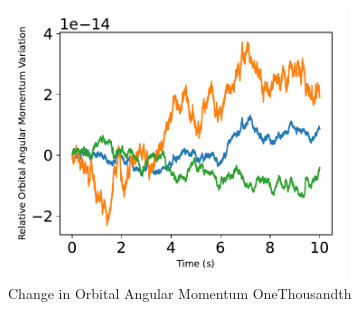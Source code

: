 \begin{figure}[htbp]\centerline{\includegraphics[width=0.8\textwidth]{AutoTeX/ChangeInOrbitalAngularMomentumOneThousandth}}\caption{Change in Orbital Angular Momentum OneThousandth}\label{fig:ChangeInOrbitalAngularMomentumOneThousandth}\end{figure}